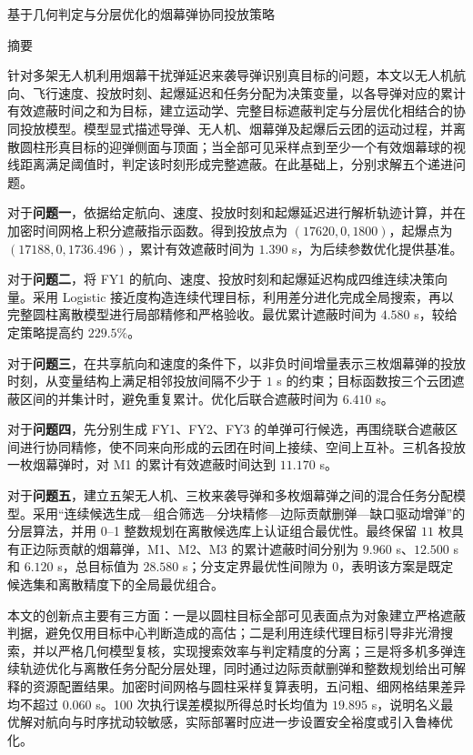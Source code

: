 \documentclass[12pt,a4paper]{ctexart}
\begin{document}
\begin{center}
{\heiti{} 基于几何判定与分层优化的烟幕弹协同投放策略\par}
\end{center}

\vspace{1.0em}
\begin{center}
{\heiti{} 摘要}
\end{center}
\vspace{0.5em}

针对多架无人机利用烟幕干扰弹延迟来袭导弹识别真目标的问题，本文以无人机航向、飞行速度、投放时刻、起爆延迟和任务分配为决策变量，以各导弹对应的累计有效遮蔽时间之和为目标，建立运动学、完整目标遮蔽判定与分层优化相结合的协同投放模型。模型显式描述导弹、无人机、烟幕弹及起爆后云团的运动过程，并离散圆柱形真目标的迎弹侧面与顶面；当全部可见采样点到至少一个有效烟幕球的视线距离满足阈值时，判定该时刻形成完整遮蔽。在此基础上，分别求解五个递进问题。

对于\textbf{问题一}，依据给定航向、速度、投放时刻和起爆延迟进行解析轨迹计算，并在加密时间网格上积分遮蔽指示函数。得到投放点为 $(17620,0,1800)$，起爆点为 $(17188,0,1736.496)$，累计有效遮蔽时间为 $1.390$ s，为后续参数优化提供基准。

对于\textbf{问题二}，将 FY1 的航向、速度、投放时刻和起爆延迟构成四维连续决策向量。采用 Logistic 接近度构造连续代理目标，利用差分进化完成全局搜索，再以完整圆柱离散模型进行局部精修和严格验收。最优累计遮蔽时间为 $4.580$ s，较给定策略提高约 $229.5\%$。

对于\textbf{问题三}，在共享航向和速度的条件下，以非负时间增量表示三枚烟幕弹的投放时刻，从变量结构上满足相邻投放间隔不少于 $1$ s 的约束；目标函数按三个云团遮蔽区间的并集计时，避免重复累计。优化后联合遮蔽时间为 $6.410$ s。

对于\textbf{问题四}，先分别生成 FY1、FY2、FY3 的单弹可行候选，再围绕联合遮蔽区间进行协同精修，使不同来向形成的云团在时间上接续、空间上互补。三机各投放一枚烟幕弹时，对 M1 的累计有效遮蔽时间达到 $11.170$ s。

对于\textbf{问题五}，建立五架无人机、三枚来袭导弹和多枚烟幕弹之间的混合任务分配模型。采用“连续候选生成—组合筛选—分块精修—边际贡献删弹—缺口驱动增弹”的分层算法，并用 0--1 整数规划在离散候选库上认证组合最优性。最终保留 $11$ 枚具有正边际贡献的烟幕弹，M1、M2、M3 的累计遮蔽时间分别为 $9.960$ s、$12.500$ s 和 $6.120$ s，总目标值为 $28.580$ s；分支定界最优性间隙为 0，表明该方案是既定候选集和离散精度下的全局最优组合。

本文的创新点主要有三方面：一是以圆柱目标全部可见表面点为对象建立严格遮蔽判据，避免仅用目标中心判断造成的高估；二是利用连续代理目标引导非光滑搜索，并以严格几何模型复核，实现搜索效率与判定精度的分离；三是将多机多弹连续轨迹优化与离散任务分配分层处理，同时通过边际贡献删弹和整数规划给出可解释的资源配置结果。加密时间网格与圆柱采样复算表明，五问粗、细网格结果差异均不超过 $0.060$ s。100 次执行误差模拟所得总时长均值为 $19.895$ s，说明名义最优解对航向与时序扰动较敏感，实际部署时应进一步设置安全裕度或引入鲁棒优化。
\end{document}
